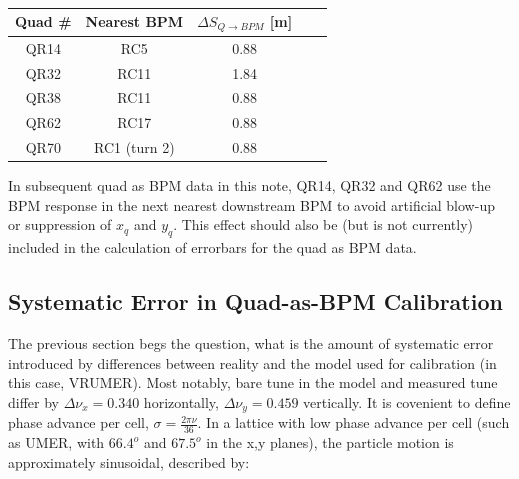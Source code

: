 \begin{table}
\centering
\caption{}
\label{tab:nulls}
\begin{tabular}{|c|c|c|c|c|}
Quad \# & Nearest BPM & $\Delta S_{Q \rightarrow BPM}$ [m] \\
\hline
QR14 & RC5 & 0.88   \\
QR32 & RC11 & 1.84 \\
QR38 & RC11 & 0.88 \\
QR62 & RC17 & 0.88  \\
QR70 & RC1 (turn 2) & 0.88  \\
\end{tabular}
\end{table}





In subsequent quad as BPM data in this note, QR14, QR32 and QR62 use the BPM response in the next nearest downstream BPM to avoid artificial blow-up or suppression of $x_q$ and $y_q$. 
This effect should also be (but is not currently) included in the calculation of errorbars for the quad as BPM data.

\subsection{Systematic Error in Quad-as-BPM Calibration} \label{sec:steering:errors}

The previous section begs the question, what is the amount of systematic error introduced by differences between reality and the model used for calibration (in this case, VRUMER). Most notably, bare tune in the model and measured tune differ by $\Delta \nu_x = 0.340$ horizontally, $\Delta \nu_y = 0.459$ vertically. It is covenient to define phase advance per cell, $\sigma = \frac{2\pi\nu}{36}$. In a lattice with low phase advance per cell (such as UMER, with $66.4 ^o$ and $67.5 ^o$ in the x,y planes), the particle motion is approximately sinusoidal, described by: 

